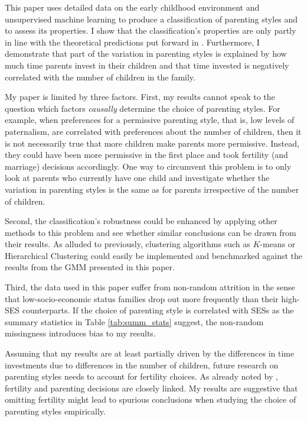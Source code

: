 This paper uses detailed data on the early childhood environment and unsupervised machine learning to produce a classification of parenting styles and to assess its properties. I show that the classification's properties are only partly in line with the theoretical predictions put forward in \textcites{doepkeParentingStyleAltruism2017}{doepkeEconomicsParenting2019}. Furthermore, I demonstrate that part of the variation in parenting styles is explained by how much time parents invest in their children and that time invested is negatively correlated with the number of children in the family. 

My paper is limited by three factors. First, my results cannot speak to the question which factors \textit{causally} determine the choice of parenting styles. For example, when preferences for a permissive parenting style, that is, low levels of paternalism, are correlated with preferences about the number of children, then it is not necessarily true that more children make parents more permissive. Instead, they could have been more permissive in the first place and took fertility (and marriage) decisions accordingly. One way to circumvent this problem is to only look at parents who currently have one child and investigate whether the variation in parenting styles is the same as for parents irrespective of the number of children.

Second, the classification's robustness could be enhanced by applying other methods to this problem and see whether similar conclusions can be drawn from their results. As alluded to previously, clustering algorithms such as $K$-means or Hierarchical Clustering could easily be implemented and benchmarked against the results from the GMM presented in this paper.    

Third, the data used in this paper suffer from non-random attrition in the sense that low-socio-economic status families drop out more frequently than their high-SES counterparts. If the choice of parenting style is correlated with SESs as the summary statistics in Table \ref{tab:summ_stats} suggest, the non-random missingness introduces bias to my results.

Assuming that my results are at least partially driven by the differences in time investments due to differences in the number of children, future research on parenting styles needs to account for fertility choices. As already noted by \textcite{doepkeEconomicsParenting2019}, fertility and parenting decisions are closely linked. My results are suggestive that omitting fertility might lead to spurious conclusions when studying the choice of parenting styles empirically.